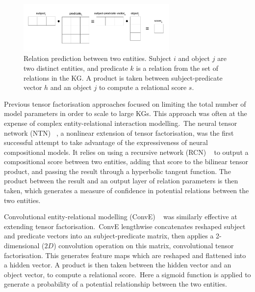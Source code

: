 \begin{figure}[H]
   	\centering
    	\includegraphics[width=0.7\textwidth, height=0.3\textwidth]{inference}
	\captionsetup{justification=centering}
	\caption{Relation prediction between two entities. Subject $ i $ and object $ j $ are two distinct entities, and predicate $ k $ is a relation from the set of relations in the KG. A product is taken between subject-predicate vector $ h $ and an object $ j $ to compute a relational score $ s $.}
\end{figure}

\noindent Previous tensor factorisation approaches focused on limiting the total number of model parameters in order to scale to large KGs. This approach was often at the expense of complex entity-relational interaction modelling.\ The neural tensor network (NTN) \unskip~\citep{socher2013reasoning}, a nonlinear extension of tensor factorisation, was the first successful attempt to take advantage of the expressiveness of neural compositional models. It relies on using a recursive network (RCN) \unskip ~\citep{pollack1990recursive} to output a compositional score between two entities, adding that score to the bilinear tensor product, and passing the result through a hyperbolic tangent function. The product between the result and an output layer of relation parameters is then taken, which generates a measure of confidence in potential relations between the two entities.\par

\noindent Convolutional entity-relational modelling (ConvE) \unskip~\citep{dettmers2018convolutional} was similarly effective at extending tensor factorisation.\ ConvE lengthwise concatenates reshaped subject and predicate vectors into an subject-predicate matrix, then applies a 2-dimensional ($ 2D $) convolution operation on this matrix, convolutional tensor factorisation. This generates feature maps which are reshaped and flattened into a hidden vector. A product is then taken between the hidden vector and an object vector, to compute a relational score.\ Here a sigmoid function is applied to generate a probability of a potential relationship between the two entities. \par 

